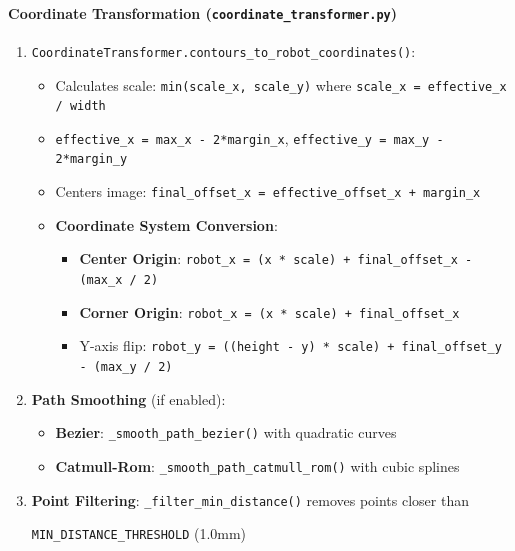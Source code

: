 \documentclass[a4paper,12pt]{article}
\begin{document}
\paragraph{Coordinate Transformation (\texttt{coordinate\_transformer.py})}
\begin{enumerate}
\item \texttt{CoordinateTransformer.contours\_to\_robot\_coordinates()}:
	\begin{itemize}
	\item Calculates scale: \texttt{min(scale\_x, scale\_y)} where \texttt{scale\_x = effective\_x / width}
	\item \texttt{effective\_x = max\_x - 2*margin\_x}, \texttt{effective\_y = max\_y - 2*margin\_y}
	\item Centers image: \texttt{final\_offset\_x = effective\_offset\_x + margin\_x}
	\item \textbf{Coordinate System Conversion}:
		\begin{itemize}
		\item \textbf{Center Origin}: \texttt{robot\_x = (x * scale) + final\_offset\_x - (max\_x / 2)}
		\item \textbf{Corner Origin}: \texttt{robot\_x = (x * scale) + final\_offset\_x}
		\item Y-axis flip: \texttt{robot\_y = ((height - y) * scale) + final\_offset\_y - (max\_y / 2)}
		\end{itemize}
	\end{itemize}

\item \textbf{Path Smoothing} (if enabled):
	\begin{itemize}
	\item \textbf{Bezier}: \texttt{\_smooth\_path\_bezier()} with quadratic curves
	\item \textbf{Catmull-Rom}: \texttt{\_smooth\_path\_catmull\_rom()} with cubic splines
	\end{itemize}

\item \textbf{Point Filtering}: \texttt{\_filter\_min\_distance()} removes points closer than

\texttt{MIN\_DISTANCE\_THRESHOLD} (1.0mm)
\end{enumerate}
\end{document}
